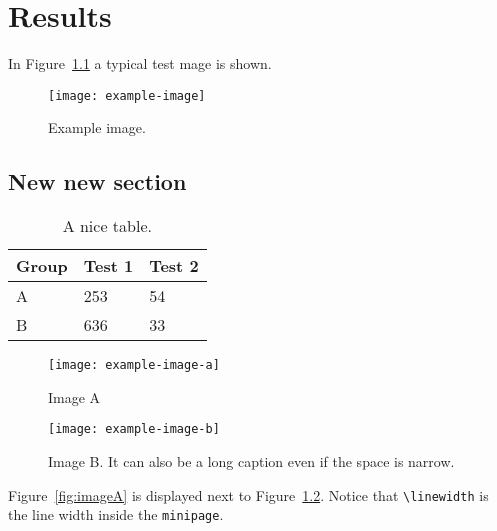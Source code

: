\chapter{Results}

In Figure~\ref{fig:testfig} a typical test mage is shown.
\begin{figure}[htbp]
  \centering
  \texttt{[image: example-image]}
  \caption{Example image.}
  \label{fig:testfig}
\end{figure}

\section{New new section}
\lipsum[1-2]
\begin{table}[htbp]
  \centering
  \begin{tabular}{lll}
    Group & Test 1 & Test 2\\\hline
    A & 253 &54\\
    B & 636 & 33
  \end{tabular}
  \caption{A nice table.}
  \label{tab:tabletest}
\end{table}

\lipsum[3]
\begin{figure}[htbp]
  \begin{minipage}[t]{0.5\linewidth}
    \centering
    \texttt{[image: example-image-a]}
    \caption{Image A}
    \label{fig:imageA}
  \end{minipage}%
  \begin{minipage}[t]{0.5\linewidth}
    \centering
    \texttt{[image: example-image-b]}
    \caption{Image B. It can also be a long caption even if the space is narrow.}
    \label{fig:imageB}
  \end{minipage}
\end{figure}

Figure~\ref{fig:imageA} is displayed next to Figure~\ref{fig:imageB}. Notice that \verb|\linewidth| is the line width inside the \verb|minipage|.

\lipsum[4]
